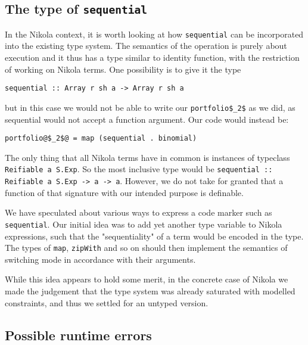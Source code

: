 \subsection{The type of \texttt{sequential}}
In the Nikola context, it is worth looking at how
\lstinline{sequential} can be incorporated into the existing type
system. The semantics of the operation is purely about execution and
it thus has a type similar to identity function, with the restriction
of working on Nikola terms. One possibility is to give it the type
\begin{lstlisting}
sequential :: Array r sh a -> Array r sh a
\end{lstlisting}
but in this case we would not be able to write our
\lstinline[mathescape]{portfolio$_2$} as we did, as sequential would
not accept a function argument. Our code would instead be:
\begin{lstlisting}
portfolio@$_2$@ = map (sequential . binomial)
\end{lstlisting}
The only thing that all Nikola terms have in common is instances of typeclass
\lstinline{Reifiable a S.Exp}. So the most inclusive type would be
\lstinline{sequential :: Reifiable a S.Exp -> a -> a}. However, we do not take
for granted that a function of that signature with our intended purpose is
definable.

We have speculated about various ways to express a code marker such as
\lstinline{sequential}. Our initial idea was to add yet another type variable
to Nikola expressions, such that the "sequentiality" of a term would be encoded
in the type. The types of \lstinline{map}, \lstinline{zipWith} and so on should
then implement the semantics of switching mode in accordance with their
arguments.

While this idea appears to hold some merit, in the concrete case of Nikola we
made the judgement that the type system was already saturated with modelled
constraints, and thus we settled for an untyped version.


\subsection{Possible runtime errors}

